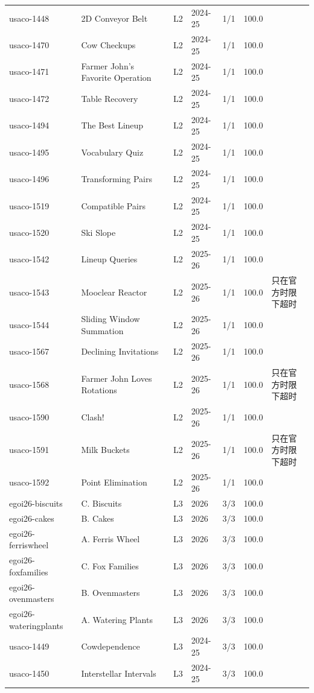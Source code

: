 \documentclass[11pt,a4paper,fontset=none]{ctexart}
\begin{document}
{\begin{longtable}{@{}l>{\raggedright\arraybackslash}p{3.4cm}llrr>{\raggedright\arraybackslash}p{3.1cm}@{}}
usaco-1448 & 2D Conveyor Belt & L2 & 2024-25 & 1/1 & 100.0 &  \\
usaco-1470 & Cow Checkups & L2 & 2024-25 & 1/1 & 100.0 &  \\
usaco-1471 & Farmer John's Favorite Operation & L2 & 2024-25 & 1/1 & 100.0 &  \\
usaco-1472 & Table Recovery & L2 & 2024-25 & 1/1 & 100.0 &  \\
usaco-1494 & The Best Lineup & L2 & 2024-25 & 1/1 & 100.0 &  \\
usaco-1495 & Vocabulary Quiz & L2 & 2024-25 & 1/1 & 100.0 &  \\
usaco-1496 & Transforming Pairs & L2 & 2024-25 & 1/1 & 100.0 &  \\
usaco-1519 & Compatible Pairs & L2 & 2024-25 & 1/1 & 100.0 &  \\
usaco-1520 & Ski Slope & L2 & 2024-25 & 1/1 & 100.0 &  \\
usaco-1542 & Lineup Queries & L2 & 2025-26 & 1/1 & 100.0 &  \\
usaco-1543 & Mooclear Reactor & L2 & 2025-26 & 1/1 & 100.0 & 只在官方时限下超时 \\
usaco-1544 & Sliding Window Summation & L2 & 2025-26 & 1/1 & 100.0 &  \\
usaco-1567 & Declining Invitations & L2 & 2025-26 & 1/1 & 100.0 &  \\
usaco-1568 & Farmer John Loves Rotations & L2 & 2025-26 & 1/1 & 100.0 & 只在官方时限下超时 \\
usaco-1590 & Clash! & L2 & 2025-26 & 1/1 & 100.0 &  \\
usaco-1591 & Milk Buckets & L2 & 2025-26 & 1/1 & 100.0 & 只在官方时限下超时 \\
usaco-1592 & Point Elimination & L2 & 2025-26 & 1/1 & 100.0 &  \\
egoi26-biscuits & C. Biscuits & L3 & 2026 & 3/3 & 100.0 &  \\
egoi26-cakes & B. Cakes & L3 & 2026 & 3/3 & 100.0 &  \\
egoi26-ferriswheel & A. Ferris Wheel & L3 & 2026 & 3/3 & 100.0 &  \\
egoi26-foxfamilies & C. Fox Families & L3 & 2026 & 3/3 & 100.0 &  \\
egoi26-ovenmasters & B. Ovenmasters & L3 & 2026 & 3/3 & 100.0 &  \\
egoi26-wateringplants & A. Watering Plants & L3 & 2026 & 3/3 & 100.0 &  \\
usaco-1449 & Cowdependence & L3 & 2024-25 & 3/3 & 100.0 &  \\
usaco-1450 & Interstellar Intervals & L3 & 2024-25 & 3/3 & 100.0 &  \\

\end{longtable}}
\end{document}
